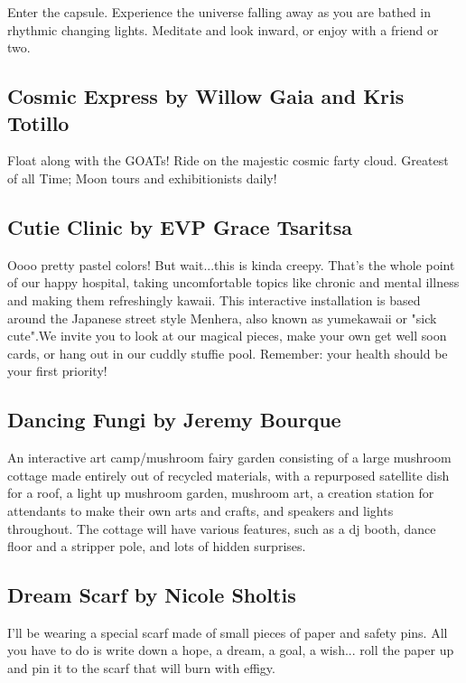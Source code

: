\begin{multicols}{2}
Enter the capsule. Experience the universe falling away as you are bathed in rhythmic changing lights. Meditate and look inward, or enjoy with a friend or two.


\subsection*{Cosmic Express by Willow Gaia and Kris Totillo}
Float along with the GOATs! Ride on the majestic cosmic farty cloud. Greatest of all Time; Moon tours and exhibitionists daily!


\subsection*{Cutie Clinic by EVP Grace Tsaritsa                        }
Oooo pretty pastel colors! But wait...this is kinda creepy. That's the whole point of our happy hospital, taking uncomfortable topics like chronic and mental illness and making them refreshingly kawaii. This interactive installation is based around the Japanese street style Menhera, also known as yumekawaii or "sick cute".We invite you to look at our magical pieces, make your own get well soon cards, or hang out in our cuddly stuffie pool. Remember: your health should be your first priority!


\subsection*{Dancing Fungi by Jeremy Bourque                }
An interactive art camp/mushroom fairy garden consisting of a large mushroom cottage made entirely out of recycled materials, with a repurposed satellite dish for a roof, a light up mushroom garden, mushroom art, a creation station for attendants to make their own arts and crafts, and speakers and lights throughout. The cottage will have various features, such as a dj booth, dance floor and a stripper pole, and lots of hidden surprises.


\subsection*{Dream Scarf by Nicole Sholtis                 }
I'll be wearing a special scarf made of small pieces of paper and safety pins. All you have to do is write down a hope, a dream, a goal, a wish... roll the paper up and pin it to the scarf that will burn with effigy.        



\end{multicols}
